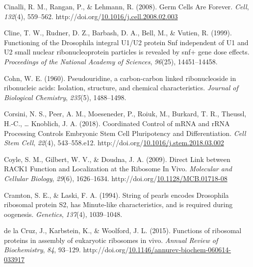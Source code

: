 \documentclass[12pt,oneside]{reedthesis}
\newlength{\cslhangindent}
\newenvironment{CSLReferences}[2] %
 {%
  \setlength{\parindent}{0pt}
  \ifodd #1 \everypar{\setlength{\hangindent}{\cslhangindent}}\ignorespaces\fi
  \ifnum #2 > 0
  \setlength{\parskip}{#2\baselineskip}
  \fi
 }%
 {}
\begin{document}
\begin{CSLReferences}{1}{0}
\leavevmode{}%
Cinalli, R. M., Rangan, P., \& Lehmann, R. (2008). Germ {Cells Are Forever}. \emph{Cell}, \emph{132}(4), 559--562. http://doi.org/\href{https://doi.org/10.1016/j.cell.2008.02.003}{10.1016/j.cell.2008.02.003}

\leavevmode{}%
Cline, T. W., Rudner, D. Z., Barbash, D. A., Bell, M., \& Vutien, R. (1999). Functioning of the {Drosophila} integral {U1}/{U2} protein {Snf} independent of {U1} and {U2} small nuclear ribonucleoprotein particles is revealed by snf+ gene dose effects. \emph{Proceedings of the National Academy of Sciences}, \emph{96}(25), 14451--14458.

\leavevmode{}%
Cohn, W. E. (1960). Pseudouridine, a carbon-carbon linked ribonucleoside in ribonucleic acids: Isolation, structure, and chemical characteristics. \emph{Journal of Biological Chemistry}, \emph{235}(5), 1488--1498.

\leavevmode{}%
Corsini, N. S., Peer, A. M., Moeseneder, P., Roiuk, M., Burkard, T. R., Theussl, H.-C., \ldots{} Knoblich, J. A. (2018). Coordinated {Control} of {mRNA} and {rRNA Processing Controls Embryonic Stem Cell Pluripotency} and {Differentiation}. \emph{Cell Stem Cell}, \emph{22}(4), 543--558.e12. http://doi.org/\href{https://doi.org/10.1016/j.stem.2018.03.002}{10.1016/j.stem.2018.03.002}

\leavevmode{}%
Coyle, S. M., Gilbert, W. V., \& Doudna, J. A. (2009). Direct {Link} between {RACK1 Function} and {Localization} at the {Ribosome In Vivo}. \emph{Molecular and Cellular Biology}, \emph{29}(6), 1626--1634. http://doi.org/\href{https://doi.org/10.1128/MCB.01718-08}{10.1128/MCB.01718-08}

\leavevmode{}%
Cramton, S. E., \& Laski, F. A. (1994). String of pearls encodes {Drosophila} ribosomal protein {S2}, has {Minute-like} characteristics, and is required during oogenesis. \emph{Genetics}, \emph{137}(4), 1039--1048.

\leavevmode{}%
de la Cruz, J., Karbstein, K., \& Woolford, J. L. (2015). Functions of ribosomal proteins in assembly of eukaryotic ribosomes in vivo. \emph{Annual Review of Biochemistry}, \emph{84}, 93--129. http://doi.org/\href{https://doi.org/10.1146/annurev-biochem-060614-033917}{10.1146/annurev-biochem-060614-033917}


\end{CSLReferences}
\end{document}
